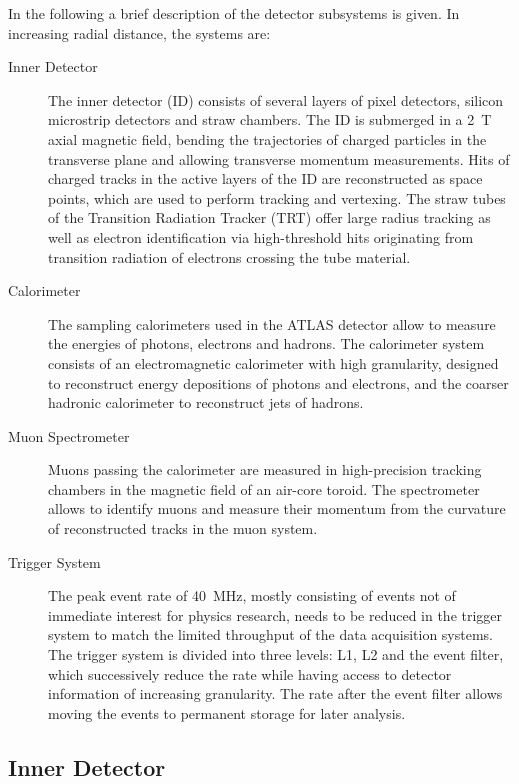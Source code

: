 In the following a brief description of the detector subsystems is given. In
increasing radial distance, the systems are:
\begin{description}
\item[Inner Detector] The inner detector (ID) consists of several layers of
  pixel detectors, silicon microstrip detectors and straw chambers. The ID is
  submerged in a \SI{2}{\tesla} axial magnetic field, bending the trajectories
  of charged particles in the transverse plane and allowing transverse momentum
  measurements. Hits of charged tracks in the active layers of the ID are
  reconstructed as space points, which are used to perform tracking and
  vertexing. The straw tubes of the Transition Radiation Tracker (TRT) offer
  large radius tracking as well as electron identification via high-threshold
  hits originating from transition radiation of electrons crossing the tube
  material.

\item[Calorimeter] The sampling calorimeters used in the ATLAS detector allow to
  measure the energies of photons, electrons and hadrons. The calorimeter system
  consists of an electromagnetic calorimeter with high granularity, designed to
  reconstruct energy depositions of photons and electrons, and the coarser
  hadronic calorimeter to reconstruct jets of hadrons.

\item[Muon Spectrometer] Muons passing the calorimeter are measured in
  high-precision tracking chambers in the magnetic field of an air-core toroid.
  The spectrometer allows to identify muons and measure their momentum from the
  curvature of reconstructed tracks in the muon system.

\item[Trigger System] The peak event rate of \SI{40}{\mega\hertz}, mostly
  consisting of events not of immediate interest for physics research, needs to
  be reduced in the trigger system to match the limited throughput of the data
  acquisition systems. The trigger system is divided into three levels: L1, L2
  and the event filter, which successively reduce the rate while having access
  to detector information of increasing granularity. The rate after the event
  filter allows moving the events to permanent storage for later analysis.
\end{description}

\subsection{Inner Detector}
\label{sec:atlas_tracking}

